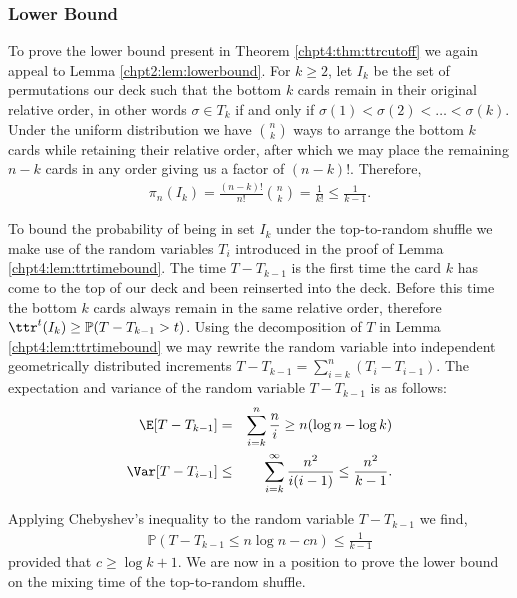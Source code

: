 \documentclass[11pt]{report}
\begin{document}
\subsubsection{Lower Bound}
To prove the lower bound present in
Theorem \ref{chpt4:thm:ttrcutoff} we again appeal to Lemma 
\ref{chpt2:lem:lowerbound}. For $k\geq 2$, let  $I_{k}$ be the set of 
permutations our deck
such that the bottom $k$ cards remain in their original relative order, in other words $\sigma \in T_{k}$ if and only if $\sigma(1) < \sigma(2) < \dots < \sigma(k)$. 
Under the uniform distribution we have ${n\choose k}$ ways to arrange the 
bottom $k$ cards while retaining their relative order, after which we may 
place the remaining $n-k$ cards in any order giving us a factor of $(n-k)!$. 
Therefore, 
\begin{eqnarray}
\pi_{n}(I_{k}) = \frac{(n-k)!}{n!}{n\choose k } = \frac{1}{k!} \leq \frac{1}{k-1}
\label{chpt4:eqn:ttrlow1}.
\end{eqnarray}


To bound the probability of being in set $I_{k}$ under the top-to-random 
shuffle we make use of the random variables $T_{i}$ introduced in the proof 
of Lemma \ref{chpt4:lem:ttrtimebound}. The time $T - T_{k-1}$ is the first 
time the card $k$ has come to the top of our deck and been reinserted into the deck. 
Before this time the bottom $k$ cards always remain in the same relative order, therefore 
$\ttr^{t}(I_{k}) \geq \mathbb{P}(T- T_{k-1} > t)$. Using the decomposition 
of $T$ in Lemma \ref{chpt4:lem:ttrtimebound} we may rewrite the random 
variable into independent geometrically distributed increments $T - T_{k-1}= \sum_{i=k}^{n} (T_{i} -T_{i-1})$. The expectation and variance of the random 
variable $T - T_{k-1}$ is as follows:	
\begin{eqnarray}
\E[T - T_{k-1}] & = & \sum_{i=k}^{n} \frac{n}{i} \geq n (\log n -\log k)\\
\Var[T - T_{i-1}] & \leq & \sum_{i=k}^{\infty} \frac{n^{2}}{i(i-1)} \leq \frac{n^{2}}{k-1}.
\end{eqnarray}

Applying Chebyshev's inequality to the random variable $T - T_{k-1}$ we find,
\begin{eqnarray}
\mathbb{P}(T- T_{k-1} \leq n\log n - cn)  \leq \frac{1}{k-1} \label{chpt4:eqn:cheby}
\end{eqnarray}
provided that $c\geq \log k +1$. We are now in a position to prove the lower bound on the mixing time of the top-to-random shuffle.
\end{document}
